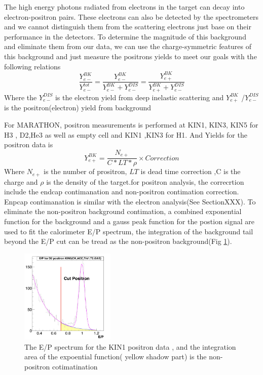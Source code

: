 The high energy photons radiated from electrons in the target can decay into electron-positron pairs. These electrons can also be detected by the spectrometers and we cannot distinguish them from the scattering electrons just base on their performance in the detectors. To determine the magnitude of this background and eliminate them from our data, we can use the charge-symmetric features of this background and just measure the positrons yields to meet our goals with the following relations
\begin{equation}\label{postiron_eq1}
\dfrac{Y_{e-}^{BK}}{Y_{e-}^{tot}}=\dfrac{Y_{e-}^{BK}}{Y_{e-}^{BK}+Y_{e-}^{DIS}}=\dfrac{Y_{e+}^{BK}}{Y_{e+}^{BK}+Y_{e-}^{DIS}}
\end{equation}  
Where the $Y_{e-}^{DIS}$ is the electron yield from deep inelastic scattering and $Y_{e+}^{BK}$ /$Y_{e-}^{DIS}$ is the positron(electron) yield from background

For MARATHON, positron measurements is performed at KIN1, KIN3, KIN5 for H3 , D2,He3 as well as empty cell and KIN1 ,KIN3 for H1. And Yields for the positron data is 
\begin{equation}\label{postiron_eq2}
Y_{e+}^{BK}=\dfrac{N_{e+}}{C*LT*\rho} \times Correction
\end{equation} 
Where $N_{e+}$ is the number of prositron, $LT$ is dead time correction ,C is the charge and $\rho$ is the density of the target.for positron analysis, the correcrtion include the endcap contimanation and non-positron contimation correction. Enpcap contimanation is similar with the electron analysis(See SectionXXX). To eliminate the non-positron background contimation, a combined exponential function for the background and a gauss peak function for the postion signal are used to fit the calorimeter E/P spectrum, the integration of the background tail beyond the E/P cut can be tread as the non-positron background(Fig \ref{po_1}).
\begin{figure}
 	\begin{center}
 		\includegraphics[width=0.4\textwidth] {./Positron_plot/Positron_1.png}
 		\caption{ The E/P spectrum for the KIN1 positron data , and the integration area of the expoential function( yellow shadow part) is the non-positron cotimatination} \label{po_1}
 	\end{center}
\end{figure}   

